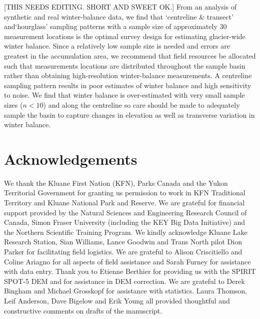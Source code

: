 \documentclass[twocolumn,letterpaper]{igs}
\begin{document}
[THIS NEEDS EDITING. SHORT AND SWEET OK.]
From an analysis of synthetic and real winter-balance data, we find that `centreline \& transect' and`hourglass' sampling patterns with a sample size of approximately 30 measurement locations is the optimal survey design for estimating glacier-wide winter balance. Since a relatively low sample size is needed and errors are greatest in the accumulation area, we recommend that field resources be allocated such that measurements locations are distributed throughout the sample basin rather than obtaining high-resolution winter-balance measurements. A centreline sampling pattern results in poor estimates of winter balance and high sensitivity to noise. We find that winter balance is over-estimated with very small sample sizes ($n<10$) and along the centreline so care should be made to adequately sample the basin to capture changes in elevation as well as transverse variation in winter balance. 

\section{Acknowledgements}

We thank the Kluane First Nation (KFN), Parks Canada and the Yukon Territorial Government for granting us permission to work in KFN Traditional Territory and Kluane National Park and Reserve. We are grateful for financial support provided by the Natural Sciences and Engineering Research Council of Canada, Simon Fraser University (including the KEY Big Data Initiative) and the Northern Scientific Training Program. We kindly acknowledge Kluane Lake Research Station, Sian Williams, Lance Goodwin and Trans North pilot Dion Parker for facilitating field logistics. We are grateful to Alison Criscitiello and Coline Ariagno for all aspects of field assistance and Sarah Furney for assistance with data entry. Thank you to Etienne Berthier for providing us with the SPIRIT SPOT-5 DEM and for assistance in DEM correction. We are grateful to Derek Bingham and Michael Grosskopf for assistance with statistics. Laura Thomson, Leif Anderson, Dave Bigelow and Erik Young all provided thoughtful and constructive comments on drafts of the manuscript.


%

%
%


\end{document}
